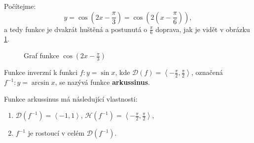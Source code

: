 \begin{reseni}
Počítejme:
$$
    y=\cos \left( 2x- \frac{\pi }{3} \right ) = \cos \left( 2 \left( x - \frac{\pi }{6} \right )  \right )  ,
$$
a tedy funkce je dvakrát huštěná a postunutá o $\frac{\pi }{6}$ doprava, jak je vidět v obrázku \ref{fig:fce2x-pi3}.
\end{reseni}

\begin{figure}[ht!]
\begin{center}
  \caption{Graf funkce $\cos (2x-\frac{\pi}{3})$}
  \label{fig:fce2x-pi3}
\end{center}
\end{figure}

\begin{definition}
Funkce inverzní k funkci $f\colon y=\sin x$, kde $\mathcal D(f)=\left<  -\frac{\pi}{2},\frac{\pi}{2} \right>$, označená $f^{-1}\colon y=\arcsin x$, se nazývá funkce \textbf{arkussinus}.
\end{definition}
\begin{pozn}
    Funkce arkussinus má následující vlastnosti:
    \begin{enumerate}
    \item $\mathcal D(f^{-1}) = \left<  -1, 1 \right>$, $\mathcal H(f^{-1}) = \left<  -\frac{\pi}{2},\frac{\pi}{2} \right>$,
    \item $f^{-1}$ je rostoucí v celém $\mathcal D(f^{-1})$.
    \end{enumerate}
\end{pozn}


